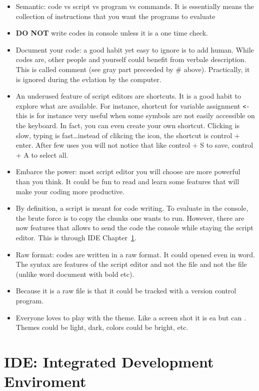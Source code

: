 \documentclass[
  letterpaper,
  DIV=11,
  numbers=noendperiod]{scrreprt}
\providecommand{\tightlist}{%
  \setlength{\itemsep}{0pt}\setlength{\parskip}{0pt}}
\begin{document}
\begin{itemize}
\tightlist
\item
  Semantic: code vs script vs program vs commands. It is essentially
  means the collection of instructions that you want the programs to
  evaluate
\item
  \textbf{DO NOT} write codes in console unless it is a one time check.
\item
  Document your code: a good habit yet easy to ignore is to add human.
  While codes are, other people and yourself could benefit from verbale
  description. This is called comment (see gray part preceeded by \#
  above). Practically, it is ignored during the evlation by the
  computer.
\item
  An underused feature of script editors are shortcuts. It is a good
  habit to explore what are available. For instance, shortcut for
  variable assignment \texttt{\textless{}-} this is for instance very
  useful when some symbols are not easily accessible on the keyboard. In
  fact, you can even create your own shortcut. Clicking is slow, typing
  is fast\ldots instead of clikcing the icon, the shortcut is control +
  enter. After few uses you will not notice that like control + S to
  save, control + A to select all.
\item
  Embarce the power: most script editor you will choose are more
  powerful than you think. It could be fun to read and learn some
  features that will make your coding more productive.
\item
  By definition, a script is meant for code writing. To evaluate in the
  console, the brute force is to copy the chunks one wants to run.
  However, there are now features that allows to send the code the
  console while staying the script editor. This is through IDE
  Chapter~\ref{sec-ide}.
\item
  Raw format: codes are written in a raw format. It could opened even in
  word. The syntax are features of the script editor and not the file
  and not the file (unlike word document with bold etc).
\item
  Because it is a raw file is that it could be tracked with a version
  control program.
\item
  Everyone loves to play with the theme. Like a screen shot it is ea but
  can . Themes could be light, dark, colors could be bright, etc.
\end{itemize}

\chapter{IDE: Integrated Development Enviroment}\label{sec-ide}
\end{document}
